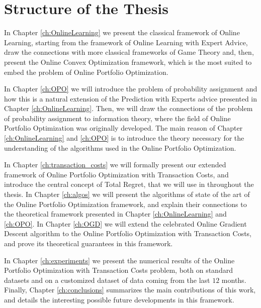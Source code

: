 \section{Structure of the Thesis}

In Chapter \ref{ch:OnlineLearning} we present the classical framework of Online Learning, starting from the framework of Online Learning with Expert Advice, draw the connections with more classical frameworks of Game Theory and, then, present the Online Convex Optimization framework, which is the most suited to embed the problem of Online Portfolio Optimization. 

In Chapter \ref{ch:OPO} we will introduce the problem of probability assignment and how this is a natural extension of the Prediction with Experts advice presented in Chapter \ref{ch:OnlineLearning}. Then, we will draw the connections of the problem of probability assignment to information theory, where the field of Online Portfolio Optimization was originally developed. The main reason of Chapter \ref{ch:OnlineLearning} and \ref{ch:OPO} is to introduce the theory necessary for the understanding of the algorithms used in the Online Portfolio Optimization.

In Chapter \ref{ch:transaction_costs} we will formally present our extended framework of Online Portfolio Optimization with Transaction Costs, and introduce the central concept of Total Regret, that we will use in throughout the thesis. In Chapter \ref{ch:algos} we will present the algorithms of  state of the art of the Online Portfolio Optimization framework, and explain their connections to the theoretical framework presented in Chapter \ref{ch:OnlineLearning} and \ref{ch:OPO}. In Chapter \ref{ch:OGD} we will extend the celebrated Online Gradient Descent algorithm to the Online Portfolio Optimization with Transaction Costs, and prove its theoretical guarantees in this framework.

In Chapter \ref{ch:experiments} we present the numerical results of the Online Portfolio Optimization with Transaction Costs problem, both on standard datasets and on a customized dataset of data coming from the last $12$ months. Finally, Chapter \ref{ch:conclusions} summarizes the main contributions of this work, and details the interesting possible future developments in this framework.
